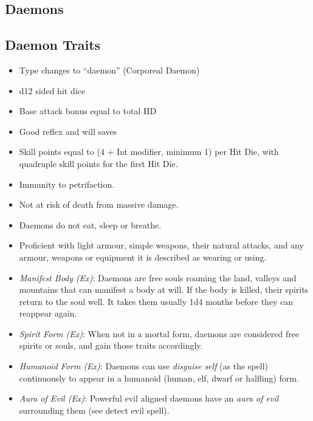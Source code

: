 \subsection{Daemons}
\label{sec:monsters:Daemons}

\subsection{Daemon Traits}
\label{sec:Daemon Traits}

\begin{itemize}[noitemsep]
  \item Type changes to ``daemon'' (Corporeal Daemon)
  \item d12 sided hit dice
  \item Base attack bonus equal to total HD
  \item Good reflex and will saves
  \item Skill points equal to (4 + Int modifier, minimum 1) per Hit Die, with
    quadruple skill points for the first Hit Die.
  \item Immunity to petrifaction.
  \item Not at risk of death from massive damage.
  \item Daemons do not eat, sleep or breathe.
  \item Proficient with light armour, simple weapons, their natural attacks,
    and any armour, weapons or equipment it is described as wearing or using.
  \item \emph{Manifest Body (Ex)}: Daemons are free souls roaming the land,
    valleys and mountains that can manifest a body at will. If the body is
    killed, their spirits return to the soul well. It takes them usually 1d4
    months before they can reappear again.
  \item \emph{Spirit Form (Ex)}: When not in a mortal form, daemons are
    considered free spirits or souls, and gain those traits accordingly.
  \item \emph{Humanoid Form (Ex)}: Daemons can use \emph{disguise self} (as
    the spell) continuously to appear in a humanoid (human, elf, dwarf or
    halfling) form.
  \item \emph{Aura of Evil (Ex)}: Powerful evil aligned daemons have an
    \emph{aura of evil} surrounding them (see detect evil spell).
\end{itemize}
